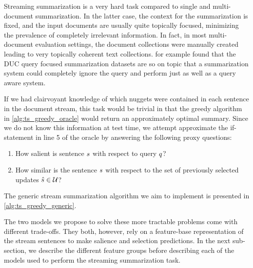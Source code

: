 Streaming summarization is a very hard task compared to single and 
multi-document summarization. In the latter case, the context for the 
summarization is fixed, and the input documents are usually quite 
topically focused, minimizing the prevalence of completely irrelevant 
information. In fact, in most multi-document evaluation settings, the
document collections were manually created leading to very topically
coherent text collections. 
\cite{baumel2016topic} for example found that the DUC
query focused summarization datasets are so on topic that a summarization
system could completely ignore the query and perform just as well as a
query aware system.




If we had clairvoyant knowledge of which nuggets were contained in each
sentence in the document stream,
this task would be trivial in that the greedy algorithm in 
\autoref{alg:ts_greedy_oracle} would return an approximately optimal summary.
Since we do not know this information at test time, we attempt approximate
the if-statement in line 5 of the oracle by answering the following proxy 
questions:
\begin{enumerate}
    \item How salient is sentence $s$ with respect to query $q$?
    \item How similar is the sentence $s$ with respect to the set of 
            previously selected updates $\hat{s} \in \mathcal{U}$?
\end{enumerate}
The generic stream summarization algorithm we aim to implement is presented
in \autoref{alg:ts_greedy_generic}.

The two models we propose to solve these more tractable problems come with
different trade-offs. They both, however, rely on a feature-base 
representation of the stream sentences to make salience and selection 
predictions. In the next sub-section, we describe the different feature
groups before describing each of the models used to perform the streaming
summarization task.







